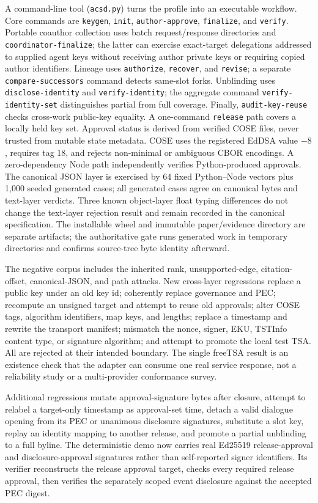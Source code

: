 \documentclass[acmsmall,screen,review,nonacm]{acmart}
\begin{document}
A command-line tool (\texttt{acsd.py}) turns the profile into an executable
workflow. Core commands are \texttt{keygen}, \texttt{init},
\texttt{author-approve}, \texttt{finalize}, and \texttt{verify}. Portable
coauthor collection uses batch request/response directories and
\texttt{coordinator-finalize}; the latter can exercise exact-target
delegations addressed to supplied agent keys without receiving author private
keys or requiring copied author identifiers. Lineage uses \texttt{authorize},
\texttt{recover}, and \texttt{revise}; a separate \texttt{compare-successors} command detects
same-slot forks. Unblinding uses \texttt{disclose-identity} and
\texttt{verify-identity}; the aggregate command
\texttt{verify-identity-set} distinguishes partial from full coverage.
Finally, \texttt{audit-key-reuse} checks cross-work public-key equality. A
one-command \texttt{release} path covers a locally held key set. Approval
status is derived
from verified COSE files, never trusted from mutable state metadata. COSE uses
the registered EdDSA value $-8$, requires tag 18, and rejects non-minimal or
ambiguous CBOR encodings. A zero-dependency Node path independently verifies
Python-produced approvals. The canonical JSON layer is exercised by 64 fixed
Python--Node vectors plus 1,000 seeded generated cases; all generated cases
agree on canonical bytes and text-layer verdicts. Three known object-layer
float typing differences do not change the text-layer rejection result and
remain recorded in the canonical specification. The installable wheel and
immutable paper/evidence directory are separate artifacts; the authoritative
gate runs generated work in temporary directories and confirms source-tree
byte identity afterward.

The negative corpus includes the inherited rank, unsupported-edge,
citation-offset, canonical-JSON, and path attacks. New cross-layer regressions
replace a public key under an old key id; coherently replace governance and PEC;
recompute an unsigned target and attempt to reuse old approvals; alter COSE tags,
algorithm identifiers, map keys, and lengths; replace a timestamp and rewrite
the transport manifest; mismatch the nonce, signer, EKU, TSTInfo content type,
or signature algorithm; and attempt to promote the local test TSA. All are
rejected at their intended boundary. The single freeTSA result is an existence
check that the adapter can consume one real service response, not a reliability
study or a multi-provider conformance survey.

Additional regressions mutate approval-signature bytes after closure, attempt
to relabel a target-only timestamp as approval-set time, detach a valid dialogue
opening from its PEC or unanimous disclosure signatures, substitute a slot
key, replay an identity mapping to another release, and promote a partial
unblinding to a full byline. The deterministic demo now carries real Ed25519
release-approval and disclosure-approval signatures rather than self-reported
signer identifiers. Its verifier reconstructs the release approval target,
checks every required release approval, then verifies the separately scoped
event disclosure against the accepted PEC digest.
\end{document}

